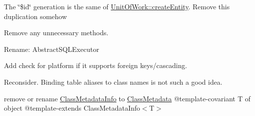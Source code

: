 
\begin{DoxyRefList}
\item[Global \mbox{\hyperlink{class_doctrine_1_1_o_r_m_1_1_internal_1_1_hydration_1_1_abstract_hydrator_a2ba53ad60e49d854bf30df01d2319a4f}{Abstract\+Hydrator\+::register\+Managed}} (Class\+Metadata \$class, \$entity, array \$data)]\label{todo__todo000007}%
%
The \char`\"{}\$id\char`\"{} generation is the same of \mbox{\hyperlink{class_doctrine_1_1_o_r_m_1_1_unit_of_work_a9466c36d0a529a0efe43065f1a8d845c}{Unit\+Of\+Work\+::create\+Entity}}. Remove this duplication somehow  
\item[Class \mbox{\hyperlink{class_doctrine_1_1_d_b_a_l_1_1_platforms_1_1_abstract_platform}{Abstract\+Platform}} ]\label{todo__todo000001}%
%
Remove any unnecessary methods.  
\item[Class \mbox{\hyperlink{class_doctrine_1_1_o_r_m_1_1_query_1_1_exec_1_1_abstract_sql_executor}{Abstract\+Sql\+Executor}} ]\label{todo__todo000025}%
%
Rename\+: Abstract\+SQLExecutor  
\item[Global \mbox{\hyperlink{class_doctrine_1_1_o_r_m_1_1_persisters_1_1_entity_1_1_basic_entity_persister_a6b7773cdce495414dc0f379cbfa6f87f}{Basic\+Entity\+Persister\+::delete\+Join\+Table\+Records}} (array \$identifier, array \$types)]\label{todo__todo000019}%
%
Add check for platform if it supports foreign keys/cascading.  
\item[Global \mbox{\hyperlink{class_doctrine_1_1_o_r_m_1_1_persisters_1_1_entity_1_1_basic_entity_persister_a6576418787ff9311ac6b02d23b51f2d7}{Basic\+Entity\+Persister\+::get\+SQLTable\+Alias}} (\$class\+Name, \$assoc\+Name=\textquotesingle{}\textquotesingle{})]\label{todo__todo000020}%
%
Reconsider. Binding table aliases to class names is not such a good idea.  
\item[Class \mbox{\hyperlink{class_doctrine_1_1_o_r_m_1_1_mapping_1_1_class_metadata}{Class\+Metadata}} ]\label{todo__todo000008}%
%
remove or rename \mbox{\hyperlink{class_doctrine_1_1_o_r_m_1_1_mapping_1_1_class_metadata_info}{Class\+Metadata\+Info}} to \mbox{\hyperlink{class_doctrine_1_1_o_r_m_1_1_mapping_1_1_class_metadata}{Class\+Metadata}} @template-\/covariant T of object @template-\/extends Class\+Metadata\+Info$<$\+T$>$  
\item[Global \mbox{\hyperlink{class_doctrine_1_1_o_r_m_1_1_mapping_1_1_class_metadata_info_a7516ca30af0db3cdbf9a7739b48ce91d}{Class\+Metadata\+Info\+::\+\_\+\+\_\+to\+String}} ()]\label{todo__todo000014}%

\end{DoxyRefList}
